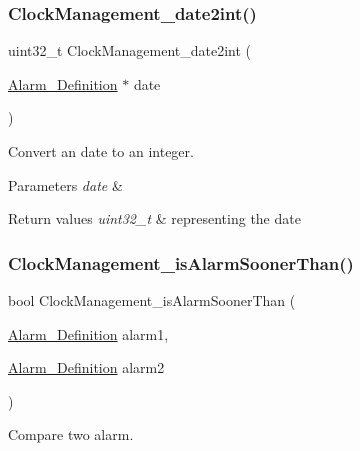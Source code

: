 \subsubsection{\texorpdfstring{Clock\+Management\+\_\+date2int()}{ClockManagement\_date2int()}}
{\footnotesize\ttfamily uint32\+\_\+t Clock\+Management\+\_\+date2int (\begin{DoxyParamCaption}\item[{\hyperlink{struct_alarm___definition}{Alarm\+\_\+\+Definition} $\ast$}]{date }\end{DoxyParamCaption})}



Convert an date to an integer. 


\begin{DoxyParams}{Parameters}
{\em date} & \\
\hline
\end{DoxyParams}

\begin{DoxyRetVals}{Return values}
{\em uint32\+\_\+t} & representing the date \\
\hline
\end{DoxyRetVals}
\mbox{\label{group___clock___management___alarm_comp_ga20358c9f73302a285a8f084823e8eb2f}} 
\subsubsection{\texorpdfstring{Clock\+Management\+\_\+is\+Alarm\+Sooner\+Than()}{ClockManagement\_isAlarmSoonerThan()}}
{\footnotesize\ttfamily bool Clock\+Management\+\_\+is\+Alarm\+Sooner\+Than (\begin{DoxyParamCaption}\item[{\hyperlink{struct_alarm___definition}{Alarm\+\_\+\+Definition}}]{alarm1,  }\item[{\hyperlink{struct_alarm___definition}{Alarm\+\_\+\+Definition}}]{alarm2 }\end{DoxyParamCaption})}



Compare two alarm. 


